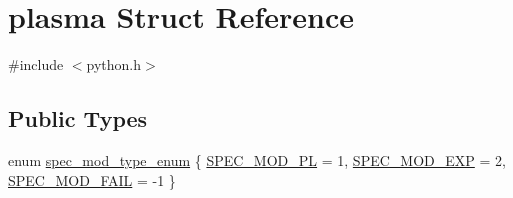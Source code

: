 \hypertarget{structplasma}{}\section{plasma Struct Reference}
\label{structplasma}


{\ttfamily \#include $<$python.\+h$>$}

\subsection*{Public Types}
\begin{DoxyCompactItemize}
\item 
enum \hyperlink{structplasma_a51fdb6f34dda1cdb03a9aebfee249706}{spec\+\_\+mod\+\_\+type\+\_\+enum} \{ \hyperlink{structplasma_a51fdb6f34dda1cdb03a9aebfee249706a7fcd3827aae177b27b0c2c4e8a4f642f}{S\+P\+E\+C\+\_\+\+M\+O\+D\+\_\+\+PL} = 1, 
\hyperlink{structplasma_a51fdb6f34dda1cdb03a9aebfee249706ac64efa71b6e422eb9a8f65c1648f30d2}{S\+P\+E\+C\+\_\+\+M\+O\+D\+\_\+\+E\+XP} = 2, 
\hyperlink{structplasma_a51fdb6f34dda1cdb03a9aebfee249706a81d4d46ab996ec4e90354768d40983f0}{S\+P\+E\+C\+\_\+\+M\+O\+D\+\_\+\+F\+A\+IL} = -\/1
 \}
\end{DoxyCompactItemize}
